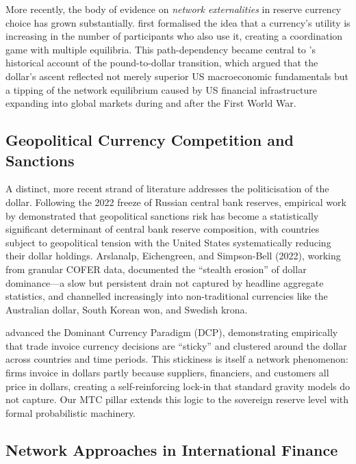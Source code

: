 \documentclass[12pt, letterpaper]{article}
\theoremstyle{definition}
\begin{document}
More recently, the body of evidence on \textit{network externalities} in reserve currency choice has grown substantially. \citet{krugman1984trade} first formalised the idea that a currency's utility is increasing in the number of participants who also use it, creating a coordination game with multiple equilibria. This path-dependency became central to \citet{eichengreen2011exorbitant}'s historical account of the pound-to-dollar transition, which argued that the dollar's ascent reflected not merely superior US macroeconomic fundamentals but a tipping of the network equilibrium caused by US financial infrastructure expanding into global markets during and after the First World War.

\subsection{Geopolitical Currency Competition and Sanctions}

A distinct, more recent strand of literature addresses the politicisation of the dollar. Following the 2022 freeze of Russian central bank reserves, empirical work by \citet{eichengreen2022sanctions} demonstrated that geopolitical sanctions risk has become a statistically significant determinant of central bank reserve composition, with countries subject to geopolitical tension with the United States systematically reducing their dollar holdings. Arslanalp, Eichengreen, and Simpson-Bell (2022), working from granular COFER data, documented the ``stealth erosion'' of dollar dominance---a slow but persistent drain not captured by headline aggregate statistics, and channelled increasingly into non-traditional currencies like the Australian dollar, South Korean won, and Swedish krona.

\citet{gopinath2022dominant} advanced the Dominant Currency Paradigm (DCP), demonstrating empirically that trade invoice currency decisions are ``sticky'' and clustered around the dollar across countries and time periods. This stickiness is itself a network phenomenon: firms invoice in dollars partly because suppliers, financiers, and customers all price in dollars, creating a self-reinforcing lock-in that standard gravity models do not capture. Our MTC pillar extends this logic to the sovereign reserve level with formal probabilistic machinery.

\subsection{Network Approaches in International Finance}
\end{document}
